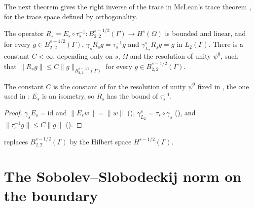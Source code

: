 The next theorem gives the right inverse of the trace in McLean's trace theorem
\cite[Theorem 3.38]{McLean}, for the trace space defined by orthogonality.

\begin{theorem}
\label{thm:trace-right-inverse}
\leanok
{}
The operator
$R_s = E_s \circ \tau_s^{-1} : B^{s-1/2}_{2,2}(\Gamma) \to H^s(\Omega)$ is bounded and linear,
and for every $g \in B^{s-1/2}_{2,2}(\Gamma)$, $\gamma_s R_s g = \tau_s^{-1} g$ and
$\gamma^s_{L_2} R_s g = g$ in $L_2(\Gamma)$. There is a constant $C < \infty$, depending only on
$s$, $\Omega$ and the resolution of unity $\psi^0$, such that
$\|R_s g\| \leq C \|g\|_{B^{s-1/2}_{2,2}(\Gamma)}$ for every $g \in B^{s-1/2}_{2,2}(\Gamma)$.
\end{theorem}

The constant $C$ is the constant of  for the resolution of unity
$\psi^0$ fixed in , the one used in :
$E_s$ is an isometry, so $R_s$ has the bound of $\tau_s^{-1}$.

\begin{proof}
\leanok
$\gamma_s E_s = \mathrm{id}$ and $\|E_s w\| = \|w\|$ (),
$\gamma^s_{L_2} = \tau_s \circ \gamma_s$ (), and
$\|\tau_s^{-1} g\| \leq C \|g\|$ ().
\end{proof}

 replaces $B^{s-1/2}_{2,2}(\Gamma)$ by the Hilbert space
$H^{s-1/2}(\Gamma)$.

\section{The Sobolev--Slobodeckij norm on the boundary}
\label{sec:boundary-slobodeckij}

